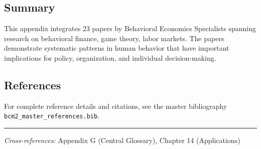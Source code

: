 \subsection{Summary}

This appendix integrates 23 papers by Behavioral Economics Specialists
spanning research on behavioral finance, game theory, labor markets.
The papers demonstrate systematic patterns in human behavior that have important
implications for policy, organization, and individual decision-making.

\subsection{References}

For complete reference details and citations, see the master bibliography
\texttt{bcm2\_master\_references.bib}.

\vspace{1em}
\hrule
\vspace{0.5em}

\noindent\textit{Cross-references:}
Appendix G (Central Glossary), Chapter 14 (Applications)
